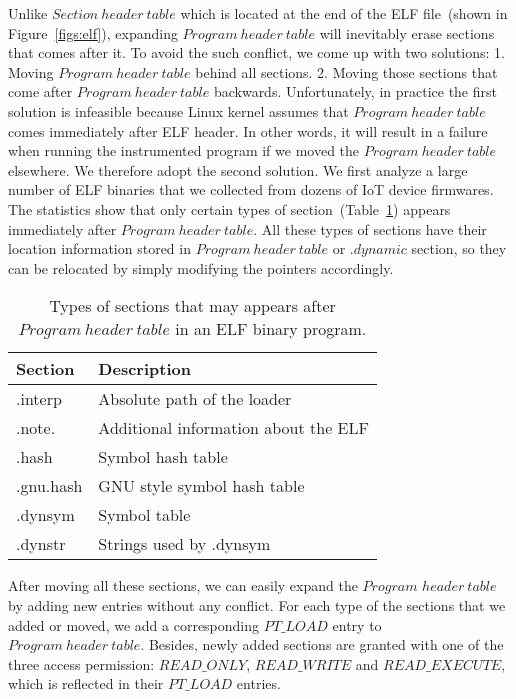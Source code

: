 Unlike $Section\ header\ table$ which is located at the end of the ELF file~(shown in Figure~\ref{figs:elf}), expanding $Program\ header\ table$ will inevitably erase sections that comes after it. To avoid the such conflict, we come up with two solutions: 1. Moving $Program\ header\ table$ behind all sections. 2. Moving those sections that come after $Program\ header\ table$ backwards. Unfortunately, in practice the first solution is infeasible because Linux kernel assumes that $Program\ header\ table$ comes immediately after ELF header. In other words, it will result in a failure when running the instrumented program if we moved the $Program\ header\ table$ elsewhere. We therefore adopt the second solution. We first analyze a large number of ELF binaries that we collected from dozens of IoT device firmwares. The statistics show that only certain types of section~(Table~\ref{table:elfsecs}) appears immediately after $Program\ header\ table$. All these types of sections have their location information stored in $Program\ header\ table$ or $.dynamic$ section, so they can be relocated by simply modifying the pointers accordingly. 
\begin{table}
\center
\begin{tabular}{|l|l|}
\hline 
Section & Description \\ 
\hline 
.interp & Absolute path of the loader \\ 
\hline 
.note. & Additional information about the ELF \\ 
\hline 
.hash & Symbol hash table \\ 
\hline 
.gnu.hash & GNU style symbol hash table \\ 
\hline 
.dynsym & Symbol table \\ 
\hline 
.dynstr & Strings used by .dynsym \\ 
\hline 
\end{tabular}
\caption{Types of sections that may appears after $Program\ header\ table$ in an ELF binary program.}
\label{table:elfsecs}
\end{table}

After moving all these sections, we can easily expand the $Program$ $header\ table$ by adding new entries without any conflict. For each type of the sections that we added or moved, we add a corresponding $PT\_LOAD$ entry to $Program\ header\ table$. Besides, newly added sections are granted with one of the three access permission: $READ\_ONLY$, $READ\_WRITE$ and $READ\_EXECUTE$, which is reflected in their $PT\_LOAD$ entries.
\vspace{5pt} 
